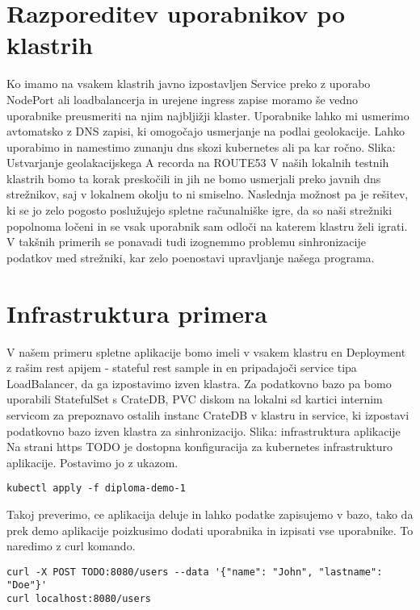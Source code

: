 \documentclass[a4paper, 12pt]{book}
\begin{document}
\section{Razporeditev uporabnikov po klastrih}
Ko imamo na vsakem klastrih javno izpostavljen Service preko z uporabo NodePort ali loadbalancerja in urejene ingress zapise moramo še vedno uporabnike preusmeriti na njim najbljižji klaster.
Uporabnike lahko mi usmerimo avtomatsko z DNS zapisi, ki omogočajo usmerjanje na podlai geolokacije.
Lahko uporabimo in namestimo zunanju dns skozi kubernetes ali pa kar ročno.
Slika: Ustvarjanje geolakacijskega A recorda na ROUTE53
V naših lokalnih testnih klastrih bomo ta korak preskočili in jih ne bomo usmerjali preko javnih dns strežnikov, saj v lokalnem okolju to ni smiselno.
Naslednja možnost pa je rešitev, ki se jo zelo pogosto poslužujejo spletne računalniške igre, da so naši strežniki popolnoma ločeni in se vsak uporabnik sam odloči na katerem klastru želi igrati.
V takšnih primerih se ponavadi tudi izognemmo problemu sinhronizacije podatkov med strežniki, kar zelo poenostavi upravljanje našega programa.
\section{Infrastruktura primera}
V našem primeru spletne aplikacije bomo imeli v vsakem klastru en Deployment z rašim rest apijem - stateful rest sample in en pripadajoči service tipa LoadBalancer, da ga izpostavimo izven klastra.
Za podatkovno bazo pa bomo uporabili StatefulSet s CrateDB, PVC diskom na lokalni sd kartici internim servicom za prepoznavo ostalih instanc CrateDB v klastru in service, ki izpostavi podatkovno bazo izven klastra za sinhronizacijo.
Slika: infrastruktura aplikacije
Na strani https TODO je dostopna konfiguracija za kubernetes infrastrukturo aplikacije. Postavimo jo z ukazom.
\begin{verbatim}
kubectl apply -f diploma-demo-1
\end{verbatim}
Takoj preverimo, ce aplikacija deluje in lahko podatke zapisujemo v bazo, tako da prek demo aplikacije poizkusimo dodati uporabnika in izpisati vse uporabnike. To naredimo z curl komando.
\begin{verbatim}
curl -X POST TODO:8080/users --data '{"name": "John", "lastname": "Doe"}'
curl localhost:8080/users
\end{verbatim}
\end{document}
